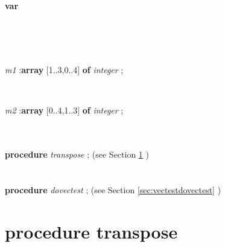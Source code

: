 \documentclass[10pt, a4paper]{article}
\begin{document}
\begin{tabbing}
\\
\<\parbox{14cm}{\textsf{\textbf{var} }}\\
\\
\\
\parbox{14cm}{\textsf{\textit{m1} :\textbf{array} [1..3,0..4] \textbf{of}  \textit{integer} ;}}\\
\parbox{14cm}{\textsf{\textit{m2} :\textbf{array} [0..4,1..3] \textbf{of}  \textit{integer} ;}}\\
\\
\<\textsf{\textbf{procedure}  \textit{transpose} ;} (see Section \ref{sec:vectesttranspose} )\\
\\
\\
\<\textsf{\textbf{procedure}  \textit{dovectest} ;} (see Section \ref{sec:vectestdovectest} )\\
\end{tabbing}
\section{procedure transpose}\label{sec:vectesttranspose}
\end{document}
